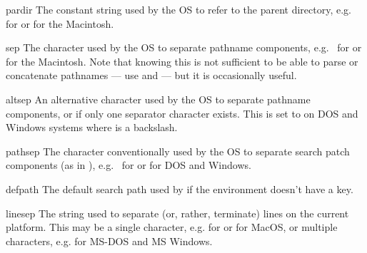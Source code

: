 \begin{datadesc}{pardir}
The constant string used by the OS to refer to the parent directory,
e.g.\  for \POSIX{} or  for the Macintosh.
\end{datadesc}

\begin{datadesc}{sep}
The character used by the OS to separate pathname components,
e.g.\ \character{/} for \POSIX{} or \character{:} for the Macintosh.
Note that knowing this is not sufficient to be able to parse or
concatenate pathnames --- use  and
 --- but it is occasionally useful.
\end{datadesc}

\begin{datadesc}{altsep}
An alternative character used by the OS to separate pathname components,
or  if only one separator character exists.  This is set to
\character{/} on DOS and Windows systems where  is a backslash.
\end{datadesc}

\begin{datadesc}{pathsep}
The character conventionally used by the OS to separate search patch
components (as in ), e.g.\ \character{:} for \POSIX{} or
\character{;} for DOS and Windows.
\end{datadesc}

\begin{datadesc}{defpath}
The default search path used by  if the environment
doesn't have a  key.
\end{datadesc}

\begin{datadesc}{linesep}
The string used to separate (or, rather, terminate) lines on the
current platform.  This may be a single character, e.g. 
for \POSIX{} or  for MacOS, or multiple characters,
e.g.  for MS-DOS and MS Windows.
\end{datadesc}
